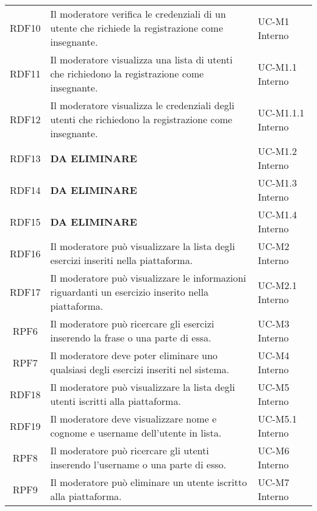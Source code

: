 \begin{tabularx}{\textwidth}{| c | p{10cm} | X |}
		RDF10 & Il moderatore verifica le credenziali di un utente che richiede la registrazione come insegnante. & UC-M1 \newline Interno\\
		RDF11 & Il moderatore visualizza una lista di utenti che richiedono la registrazione come insegnante. & UC-M1.1 \newline Interno\\
		RDF12 & Il moderatore visualizza le credenziali degli utenti che richiedono la registrazione come insegnante. & UC-M1.1.1 \newline Interno\\
		RDF13 & \textbf{DA ELIMINARE} & UC-M1.2 \newline Interno\\
		RDF14 & \textbf{DA ELIMINARE} & UC-M1.3 \newline Interno\\
		RDF15 & \textbf{DA ELIMINARE} & UC-M1.4 \newline Interno\\
		RDF16 & Il moderatore può visualizzare la lista degli esercizi inseriti nella piattaforma. & UC-M2 \newline Interno\\
		RDF17 & Il moderatore può visualizzare le informazioni riguardanti un esercizio inserito nella piattaforma. & UC-M2.1 \newline Interno\\
		RPF6 & Il moderatore può ricercare gli esercizi inserendo la frase o una parte di essa. & UC-M3 \newline Interno\\
		RPF7 & Il moderatore deve poter eliminare uno qualsiasi degli esercizi inseriti nel sistema. & UC-M4 \newline Interno\\
		RDF18 & Il moderatore può visualizzare la lista degli utenti iscritti alla piattaforma. & UC-M5 \newline Interno\\
		RDF19 & Il moderatore deve visualizzare nome e cognome e username dell'utente in lista. & UC-M5.1 \newline Interno\\
		RPF8 & Il moderatore può ricercare gli utenti inserendo l'username o una parte di esso. & UC-M6 \newline Interno\\
		RPF9 & Il moderatore può eliminare un utente iscritto alla piattaforma. & UC-M7 \newline Interno\\

\end{tabularx}
